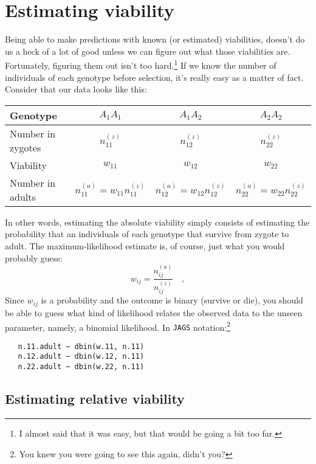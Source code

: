 \chapter{Estimating viability}

Being able to make predictions with known (or estimated) viabilities,
doesn't do us a heck of a lot of good unless we can figure out what
those viabilities are. Fortunately, figuring them out isn't too
hard.\footnote{I almost said that it was easy, but that would be going
  a bit too far.} If we know the number of individuals of each
genotype before selection, it's really easy as a matter of
fact. Consider that our data looks like this:

\begin{center}
\begin{tabular}{l|ccc}
\hline\hline
Genotype & $A_1A_1$ & $A_1A_2$ & $A_2A_2$ \\
\hline
Number in zygotes & $n_{11}^{(z)}$ & $n_{12}^{(z)}$ & $n_{22}^{(z)}$ \\
Viability         & $w_{11}$ & $w_{12}$ & $w_{22}$ \\
Number in adults  & $n_{11}^{(a)} = w_{11}n_{11}^{(z)}$ & $n_{12}^{(a)} = w_{12}n_{12}^{(z)}$ & $n_{22}^{(a)} = w_{22}n_{22}^{(z)}$ \\
\hline
\end{tabular}
\end{center}

In other words, estimating the absolute viability simply consists of
estimating the probability that an individuals of each genotype that
survive from zygote to adult. The maximum-likelihood estimate is, of
course, just what you would probably guess:
\[
w_{ij} = \frac{n_{ij}^{(a)}}{n_{ij}^{(z)}} \quad ,
\]
Since $w_{ij}$ is a probability and the outcome is binary (survive or
die), you should be able to guess what kind of likelihood relates the
observed data to the unseen parameter, namely, a binomial
likelihood. In {\tt JAGS} notation:\footnote{You knew you were going
  to see this again, didn't you?}
\begin{verbatim}
   n.11.adult ~ dbin(w.11, n.11)
   n.12.adult ~ dbin(w.12, n.11)
   n.22.adult ~ dbin(w.22, n.11)
\end{verbatim}

\section*{Estimating relative viability}

